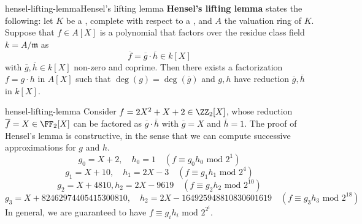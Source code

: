     

\begin{topic}{hensel-lifting-lemma}{Hensel's lifting lemma}
    \textbf{Hensel's lifting lemma} states the following: let $K$ be a , complete with respect to a  , and $A$ the valuation ring of $K$. Suppose that $f \in A[X]$ is a polynomial that factors over the residue class field $k = A / \mathfrak{m}$ as
    \[ \overline{f} = \overline{g} \cdot \overline{h} \in k[X] \]
    with $\overline{g}, \overline{h} \in k[X]$ non-zero and coprime. Then there exists a factorization $f = g \cdot h$ in $A[X]$ such that $\deg(g) = \deg(\overline{g})$ and $g, h$ have reduction $\overline{g}, \overline{h}$ in $k[X]$.
\end{topic}

\begin{example}{hensel-lifting-lemma}
    Consider $f = 2X^2 + X + 2 \in \ZZ_2[X]$, whose reduction $\overline{f} = X \in \FF_2[X]$ can be factored as $\overline{g} \cdot \overline{h}$ with $\overline{g} = X$ and $\overline{h} = 1$. The proof of Hensel's lemma is constructive, in the sense that we can compute successive approximations for $g$ and $h$.
    \[ g_0 = X + 2, \quad h_0 = 1 \quad (f \equiv g_0 h_0 \text{ mod } 2^1) \]
    \[ g_1 = X + 10, \quad h_1 = 2X - 3 \quad (f \equiv g_1 h_1 \text{ mod } 2^4) \]
    \[ g_2 = X + 4810, h_2 = 2X - 9619 \quad (f \equiv g_2 h_2 \text{ mod } 2^{10}) \]
    \[ g_3 = X + 82462974405415300810, \quad h_2 = 2X - 164925948810830601619 \quad (f \equiv g_3 h_3 \text{ mod } 2^{18}) \]
    In general, we are guaranteed to have $f \equiv g_i h_i \text{ mod } 2^{2^i}$.
\end{example}

